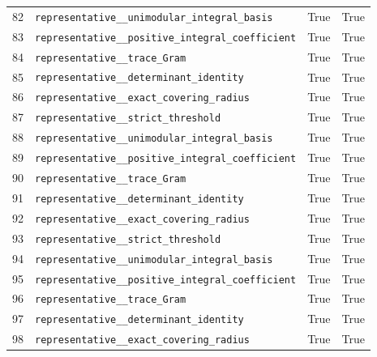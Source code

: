 \documentclass[12pt]{amsart}
\theoremstyle{remark}
\theoremstyle{definition}
\numberwithin{equation}{section}
\begin{document}
\begin{longtable}{rL{11cm}cc}
82 & \texttt{representative\_\_\allowbreak unimodular\_\allowbreak integral\_\allowbreak basis} & True & True \\
83 & \texttt{representative\_\_\allowbreak positive\_\allowbreak integral\_\allowbreak coefficient} & True & True \\
84 & \texttt{representative\_\_\allowbreak trace\_\allowbreak Gram} & True & True \\
85 & \texttt{representative\_\_\allowbreak determinant\_\allowbreak identity} & True & True \\
86 & \texttt{representative\_\_\allowbreak exact\_\allowbreak covering\_\allowbreak radius} & True & True \\
87 & \texttt{representative\_\_\allowbreak strict\_\allowbreak threshold} & True & True \\
88 & \texttt{representative\_\_\allowbreak unimodular\_\allowbreak integral\_\allowbreak basis} & True & True \\
89 & \texttt{representative\_\_\allowbreak positive\_\allowbreak integral\_\allowbreak coefficient} & True & True \\
90 & \texttt{representative\_\_\allowbreak trace\_\allowbreak Gram} & True & True \\
91 & \texttt{representative\_\_\allowbreak determinant\_\allowbreak identity} & True & True \\
92 & \texttt{representative\_\_\allowbreak exact\_\allowbreak covering\_\allowbreak radius} & True & True \\
93 & \texttt{representative\_\_\allowbreak strict\_\allowbreak threshold} & True & True \\
94 & \texttt{representative\_\_\allowbreak unimodular\_\allowbreak integral\_\allowbreak basis} & True & True \\
95 & \texttt{representative\_\_\allowbreak positive\_\allowbreak integral\_\allowbreak coefficient} & True & True \\
96 & \texttt{representative\_\_\allowbreak trace\_\allowbreak Gram} & True & True \\
97 & \texttt{representative\_\_\allowbreak determinant\_\allowbreak identity} & True & True \\
98 & \texttt{representative\_\_\allowbreak exact\_\allowbreak covering\_\allowbreak radius} & True & True \\

\end{longtable}
\end{document}
